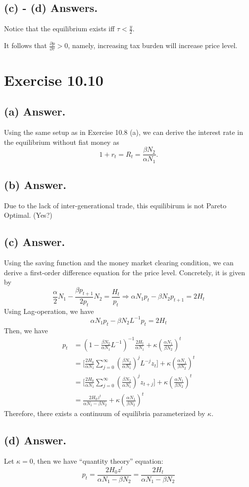 \documentclass[11pt]{article}
\theoremstyle{definition}
\theoremstyle{boldtitle} %
\numberwithin{equation}{section}
\numberwithin{figure}{section}
\numberwithin{table}{section}
\begin{document}
\subsection{(c) - (d) Answers.}
Notice that the equilibrium exists iff $\tau < \frac{y}{2}$.

It follows that $\frac{\partial p}{\partial \tau} > 0 $, namely, 
increasing tax burden will increase price level.


\section{Exercise 10.10}
\subsection{(a) Answer.}
Using the same setup as in Exercise 10.8 (a), we can derive the interest rate in the equilibrium without fiat money as
\[
1 + r_t = R_t = \frac{\beta N_2}{\alpha N_1}.
\]

\subsection{(b) Answer.}
Due to the lack of inter-generational trade, this equilibirum is not Pareto Optimal. (Yes?)


\subsection{(c) Answer.}
Using the saving function and the money market clearing condition, we can derive a first-order difference 
equation for the price level.
Concretely, it is given by 
\[
\frac{\alpha}{2} N_1 - \frac{\beta p_{t+1}}{2 p_t} N_2 = \frac{H_t}{p_t} \Rightarrow \alpha N_1 p_t - \beta N_2 p_{t+1} = 2 H_t
\]
Using Lag-operation, we have 
\[
\alpha N_1 p_t - \beta N_2 L^{-1} p_{t} = 2 H_t
\]
Then, we have 
\begin{align*}
p_t & = \left(1 - \frac{\beta N_2}{\alpha N_1} L^{-1}\right)^{-1} \frac{2H_t}{\alpha N_1} + \kappa \left(\frac{\alpha N_1}{\beta N_2}\right)^t \\ 
    & = \bigg[\frac{2H_0 }{\alpha N_1} \sum_{j = 0}^{\infty} \left(\frac{\beta N_2}{\alpha N_1}\right)^j L^{-j} z_t \bigg] + \kappa \left(\frac{\alpha N_1}{\beta N_2}\right)^t \\
    & = \bigg[\frac{2H_0 }{\alpha N_1} \sum_{j = 0}^{\infty} \left(\frac{\beta N_2}{\alpha N_1}\right)^j z_{t + j} \bigg] + \kappa \left(\frac{\alpha N_1}{\beta N_2}\right)^t \\
    & = \frac{2H_0 z^t }{\alpha N_1 - \beta N_2} + \kappa \left(\frac{\alpha N_1}{\beta N_2}\right)^t
\end{align*}
Therefore, there exists a continuum of equilibria parameterized by $\kappa$.

\subsection{(d) Answer.}
Let $\kappa = 0$, then we have ``quantity theory'' equation:
\[
p_t = \frac{2H_0 z^t }{\alpha N_1 - \beta N_2} = \frac{2H_t }{\alpha N_1 - \beta N_2}
\]



\end{document}
